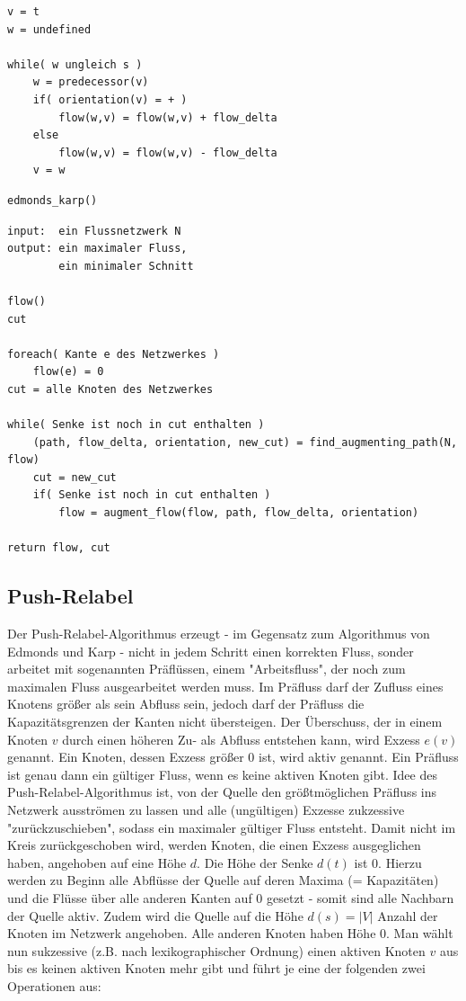 \documentclass[10pt,a4paper,landscape]{article}
\begin{document}
\begin{multicols*}{2}
\begin{verbatim}
v = t
w = undefined

while( w ungleich s )
    w = predecessor(v)
    if( orientation(v) = + )
        flow(w,v) = flow(w,v) + flow_delta
    else
        flow(w,v) = flow(w,v) - flow_delta
    v = w
    \end{verbatim}
\normalsize

    \large
\begin{verbatim}
edmonds_karp()
    \end{verbatim}
    \small
    \begin{verbatim}
input:  ein Flussnetzwerk N
output: ein maximaler Fluss,
        ein minimaler Schnitt

flow()
cut

foreach( Kante e des Netzwerkes )
    flow(e) = 0
cut = alle Knoten des Netzwerkes

while( Senke ist noch in cut enthalten )
    (path, flow_delta, orientation, new_cut) = find_augmenting_path(N, flow)
    cut = new_cut
    if( Senke ist noch in cut enthalten )
        flow = augment_flow(flow, path, flow_delta, orientation)

return flow, cut
    \end{verbatim}
\normalsize

    \subsection{ Push-Relabel }
    Der Push-Relabel-Algorithmus erzeugt - im Gegensatz zum Algorithmus von Edmonds und Karp - nicht in jedem Schritt einen korrekten Fluss, sonder arbeitet mit 
    sogenannten Präflüssen, einem  "Arbeitsfluss", der noch zum maximalen Fluss ausgearbeitet werden muss. Im Präfluss darf der 
    Zufluss eines Knotens größer als sein Abfluss sein, jedoch darf der Präfluss die Kapazitätsgrenzen der Kanten nicht übersteigen. Der Überschuss, der in 
    einem Knoten $v$ durch einen höheren Zu- als Abfluss entstehen kann, wird Exzess $e(v)$ genannt. Ein Knoten, dessen Exzess größer $0$ ist, wird aktiv genannt. 
    Ein Präfluss ist genau dann ein gültiger Fluss, wenn es keine aktiven Knoten gibt.
    \newline
    Idee des Push-Relabel-Algorithmus ist, von der Quelle den größtmöglichen Präfluss ins Netzwerk ausströmen zu lassen und alle 
    (ungültigen) Exzesse zukzessive "zurückzuschieben", sodass ein maximaler gültiger Fluss entsteht. Damit nicht im Kreis 
    zurückgeschoben wird, werden Knoten, die einen Exzess ausgeglichen haben, angehoben auf eine Höhe $d$. Die Höhe der Senke $d(t)$ ist $0$.
    \newline
    Hierzu werden zu Beginn alle Abflüsse der Quelle auf deren Maxima (= Kapazitäten) und die Flüsse über alle anderen Kanten auf $0$ gesetzt - somit sind alle
    Nachbarn der Quelle aktiv. Zudem wird die Quelle auf die Höhe $d(s) = |V|$ Anzahl der Knoten im Netzwerk angehoben. Alle anderen Knoten haben Höhe $0$. Man 
    wählt nun sukzessive (z.B. nach lexikographischer Ordnung) einen aktiven Knoten $v$ aus bis es keinen aktiven Knoten mehr gibt und führt je eine der folgenden zwei Operationen aus:

\end{multicols*}
\end{document}
